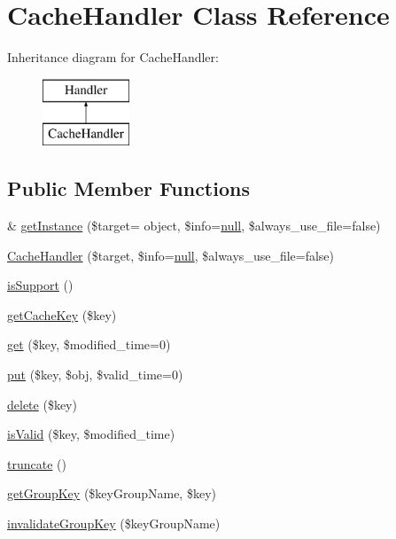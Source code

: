 \hypertarget{classCacheHandler}{}\section{Cache\+Handler Class Reference}
\label{classCacheHandler}
Inheritance diagram for Cache\+Handler\+:\begin{figure}[H]
\begin{center}
\leavevmode
\includegraphics[height=2.000000cm]{classCacheHandler}
\end{center}
\end{figure}
\subsection*{Public Member Functions}
\begin{DoxyCompactItemize}
\item 
\& \hyperlink{classCacheHandler_a2fce85cb82ab180ce9d6bcea61a54eec}{get\+Instance} (\$target= \textquotesingle{}object\textquotesingle{}, \$info=\hyperlink{modernizr_8min_8js_a286f9ec831c5e676eeb493248eab9575}{null}, \$always\+\_\+use\+\_\+file=false)
\item 
\hyperlink{classCacheHandler_a71cb13c8791b73a8153fd5bbc7aba3e3}{Cache\+Handler} (\$target, \$info=\hyperlink{modernizr_8min_8js_a286f9ec831c5e676eeb493248eab9575}{null}, \$always\+\_\+use\+\_\+file=false)
\item 
\hyperlink{classCacheHandler_a4c137721670e0e9ce1d60bdd2f7235bb}{is\+Support} ()
\item 
\hyperlink{classCacheHandler_ab849392ce5ea0d57208f39d8a6a4fa43}{get\+Cache\+Key} (\$key)
\item 
\hyperlink{classCacheHandler_af726ae7803e5a73dee47bb43fc1fb8fc}{get} (\$key, \$modified\+\_\+time=0)
\item 
\hyperlink{classCacheHandler_af7fe9532fb10504cee980d7581a31995}{put} (\$key, \$obj, \$valid\+\_\+time=0)
\item 
\hyperlink{classCacheHandler_af51c1473c877ab5e20336d0d719c27d7}{delete} (\$key)
\item 
\hyperlink{classCacheHandler_aea9da5e2293a9062bc7a5f0a4104c9ce}{is\+Valid} (\$key, \$modified\+\_\+time)
\item 
\hyperlink{classCacheHandler_a10046e23ee8c8ef41bbbb69b2dda7889}{truncate} ()
\item 
\hyperlink{classCacheHandler_ab777b6b22477848324a25346da869596}{get\+Group\+Key} (\$key\+Group\+Name, \$key)
\item 
\hyperlink{classCacheHandler_a43118f91508ad5695a13f7a332cc9389}{invalidate\+Group\+Key} (\$key\+Group\+Name)
\end{DoxyCompactItemize}
